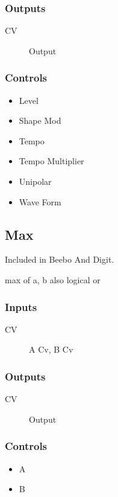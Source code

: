 \subsubsection{Outputs}
\begin{description}
\item [CV] Output
\end{description}

\subsubsection{Controls}
\begin{itemize}
\item Level
\item Shape Mod
\item Tempo
\item Tempo Multiplier
\item Unipolar
\item Wave Form
\end{itemize}

\subsection{Max}

Included in Beebo And Digit.

max of a, b also logical or



\subsubsection{Inputs}
\begin{description}
\item [CV] A Cv, B Cv
\end{description}

\subsubsection{Outputs}
\begin{description}
\item [CV] Output
\end{description}

\subsubsection{Controls}
\begin{itemize}
\item A
\item B
\end{itemize}

